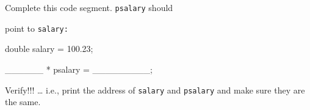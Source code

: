 Complete this code segment. \texttt{psalary} should

point to \texttt{salary:}



\begin{consolethree}[escapeinside=||]

double salary = 100.23;



______ * psalary = _________;

\end{consolethree}

Verify!!! \ldots{} i.e., print the address of \texttt{salary} and \texttt{psalary} and make sure they are the same.

